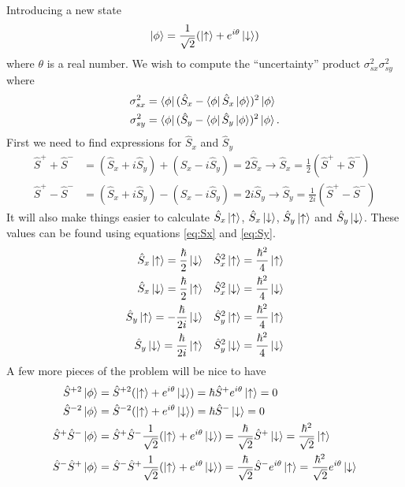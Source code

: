 \documentclass{article}
\begin{document}
Introducing a new state
\begin{equation*}
\ket{\phi}=\frac{1}{\sqrt{2}}(\ket{\uparrow}+e^{i\theta}\ket{\downarrow})
\end{equation*}
where $\theta$ is a real number. We wish to compute the ``uncertainty'' product $\sigma_{sx}^2\sigma_{sy}^2$ where
\begin{align*}
\sigma_{sx}^2 &= \bra{\phi}(\hat{S}_x-\bra{\phi}\hat{S}_x\ket{\phi} )^2\ket{\phi}  \\
\sigma_{sy}^2 &= \bra{\phi}(\hat{S}_y-\bra{\phi}\hat{S}_y\ket{\phi} )^2\ket{\phi}.
\end{align*}
First we need to find expressions for $\hat{S}_x$ and $\hat{S}_y$
\begin{align}
\label{eq:Sx}
\hat{S}^++\hat{S}^- &= (\hat{S}_x + i\hat{S}_y) + (\hat{S}_x-i\hat{S}_y) = 2\hat{S}_x 
\rightarrow \hat{S}_x = \frac{1}{2}(\hat{S}^++\hat{S}^-)\\
\label{eq:Sy}
\hat{S}^+-\hat{S}^- &= (\hat{S}_x + i\hat{S}_y) - (\hat{S}_x-i\hat{S}_y) = 2i\hat{S}_y 
\rightarrow \hat{S}_y = \frac{1}{2i}(\hat{S}^+-\hat{S}^-)
\end{align}
It will also make things easier to calculate $\hat{S}_x\ket{\uparrow}$, $\hat{S}_x\ket{\downarrow}$, $\hat{S}_y\ket{\uparrow}$ and $\hat{S}_y\ket{\downarrow}$. These values can be found using equations \ref{eq:Sx} and \ref{eq:Sy}.
\begin{align*}
\hat{S}_x\ket{\uparrow}		= \frac{\hbar}{2}\ket{\downarrow}& \quad
\hat{S}^2_x\ket{\uparrow}	= \frac{\hbar^2}{4}\ket{\uparrow}\\
\hat{S}_x\ket{\downarrow}	= \frac{\hbar}{2}\ket{\uparrow}& \quad
\hat{S}^2_x\ket{\downarrow}	= \frac{\hbar^2}{4}\ket{\downarrow}\\
\hat{S}_y\ket{\uparrow}		= -\frac{\hbar}{2i}\ket{\downarrow}& \quad
\hat{S}^2_y\ket{\uparrow}	= \frac{\hbar^2}{4}\ket{\uparrow}\\
\hat{S}_y\ket{\downarrow}	= \frac{\hbar}{2i}\ket{\uparrow}& \quad
\hat{S}^2_y\ket{\downarrow}	= \frac{\hbar^2}{4}\ket{\downarrow}\\
\end{align*}
A few more pieces of the problem will be nice to have
\begin{align*}
\hat{S}^{+2}\ket{\phi}&=\hat{S}^{+2}(\ket{\uparrow}+e^{i\theta}\ket{\downarrow})=\hbar\hat{S}^{+}e^{i\theta}\ket{\uparrow}=0 \\
\hat{S}^{-2}\ket{\phi}&=\hat{S}^{-2}(\ket{\uparrow}+e^{i\theta}\ket{\downarrow})=\hbar\hat{S}^{-}\ket{\downarrow}=0 \\
\hat{S}^+\hat{S}^-\ket{\phi}&=\hat{S}^+\hat{S}^-\frac{1}{\sqrt{2}}(\ket{\uparrow}+e^{i\theta}\ket{\downarrow})=\frac{\hbar}{\sqrt{2}}\hat{S}^+\ket{\downarrow} = \frac{\hbar^2}{\sqrt{2}}\ket{\uparrow} \\
\hat{S}^-\hat{S}^+\ket{\phi}&=\hat{S}^-\hat{S}^+\frac{1}{\sqrt{2}}(\ket{\uparrow}+e^{i\theta}\ket{\downarrow})=\frac{\hbar}{\sqrt{2}}\hat{S}^-e^{i\theta}\ket{\uparrow} = \frac{\hbar^2}{\sqrt{2}}e^{i\theta}\ket{\downarrow}
\end{align*}
\end{document}

